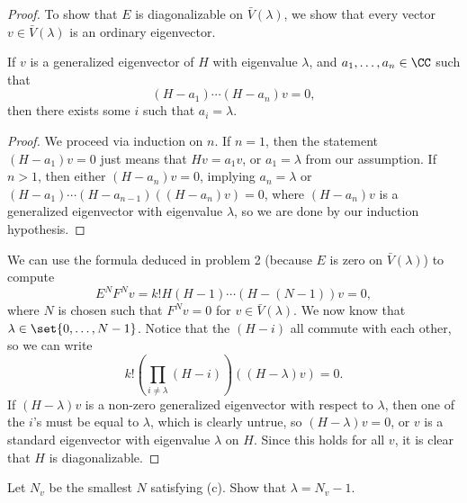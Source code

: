 \documentclass{article}
\begin{document}
\begin{proof}
To show that $E$ is diagonalizable on $\bar{V}(\lambda)$, we show that every
vector $v \in \bar{V}(\lambda)$ is an ordinary eigenvector.

\begin{lem}
If $v$ is a generalized eigenvector of $H$ with eigenvalue $\lambda$, and $a_1,
\dots, a_n \in \CC$ such that
\[ (H - a_1) \cdots (H - a_n) v = 0, \]
then there exists some $i$ such that $a_i = \lambda$.
\end{lem}

\begin{proof}
We proceed via induction on $n$.  If $n = 1$, then the statement $(H - a_1)v =
0$ just means that $Hv = a_1v$, or $a_1 = \lambda$ from our assumption. If $n >
1$, then either $(H - a_n)v = 0$, implying $a_n = \lambda$ or $(H - a_1) \cdots
(H - a_{n - 1})((H - a_n)v) = 0$, where $(H - a_n)v$ is a generalized
eigenvector with eigenvalue $\lambda$, so we are done by our induction
hypothesis.
\end{proof}

We can use the formula deduced in problem 2 (because $E$ is zero on
$\bar{V}(\lambda)$) to compute
\[ E^N F^N v = k! H (H - 1) \cdots (H - (N - 1)) v = 0, \]
where $N$ is chosen such that $F^N v = 0$ for $v \in \bar{V}(\lambda)$. We now
know that $\lambda \in \set{0, \dots, N - 1}$. Notice that the $(H - i)$ all
commute with each other, so we can write
\[ k! \left( \prod_{i \neq \lambda} (H - i) \right) ((H - \lambda)v) = 0. \]
If $(H - \lambda)v$ is a non-zero generalized eigenvector with respect to
$\lambda$, then one of the $i$'s must be equal to $\lambda$, which is clearly
untrue, so $(H - \lambda)v = 0$, or $v$ is a standard eigenvector with
eigenvalue $\lambda$ on $H$. Since this holds for all $v$, it is clear that $H$
is diagonalizable.
\end{proof}

\begin{prb}
Let $N_v$ be the smallest $N$ satisfying (c). Show that $\lambda = N_v - 1$.
\end{prb}
\end{document}
